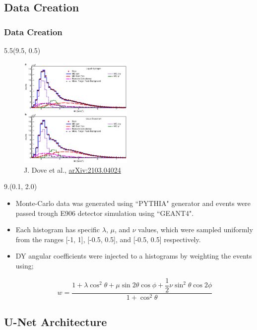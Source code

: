 \documentclass[12pt, xcolor={dvipsnames}, aspectratio = 169, sans, mathserif]{beamer}
\newenvironment{List}[2]
{\begin{textblock}{#1}#2
\begin{itemize}}
{\end{itemize}
\end{textblock}}
\newenvironment{Pic}[2]
{\begin{textblock}{#1}#2
\begin{figure}}
{\end{figure}
\end{textblock}}
\newcommand{\NewCaption}[3]{\caption{{#1}, \textcolor{blue}{\href{#2}{#3}}}}
\begin{document}
\subsection{Data Creation}

\begin{frame}
\frametitle{Data Creation}

\begin{Pic}{5.5}{(9.5, 0.5)}
  \NewCaption{J. Dove et al.}{https://arxiv.org/abs/2103.04024}{arXiv:2103.04024}
  \includegraphics[width=5.5cm]{imgs/mc2real.png}
\end{Pic}

\begin{List}{9.}{(0.1, 2.0)}

  \item Monte-Carlo data was generated using ``PYTHIA" generator and events were passed trough E906 detector simulation using ``GEANT4".

  \item Each histogram has specific $\lambda$, $\mu$, and $\nu$ values, which were sampled uniformly from the ranges [-1, 1], [-0.5, 0.5], and [-0.5, 0.5] respectively.

  \item DY angular coefficients were injected to a histograms by weighting the events using;

  \begin{equation*}
w = \frac{1  + \lambda \cos^{2}\theta + \mu \sin 2 \theta \cos \phi + \dfrac{1}{2}\nu \sin^{2}\theta \cos 2 \phi}{1 + \cos^{2}\theta}
  \end{equation*}

\end{List}
\end{frame}

\subsection{U-Net Architecture}
\end{document}

